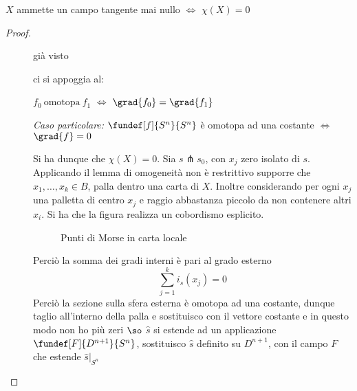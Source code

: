 

\begin{teo}
$X$ ammette un campo tangente mai nullo $\iff$ $\chi(X) = 0$
\end{teo}

\begin{proof}
~
	\begin{description}
		\item[\proofrightarrow]
		già visto		
		\item[\proofleftarrow]
		ci si appoggia al:
		\begin{teo}
		$f_0~\text{omotopa}~f_1$ $\iff$ $\grad{f_0} = \grad{f_1}$

		\emph{Caso particolare:} $\fundef[f]{S^n}{S^n}$ è omotopa ad una costante $\iff$ $\grad{f} = 0$
		\end{teo}
		Si ha dunque che $\chi(X) = 0$. Sia $s \pitchfork s_0$, con $x_j$ zero isolato di $s$.
		Applicando il lemma di omogeneità non è restrittivo supporre che $x_1, \dots, x_k \in B$, palla dentro una carta di $X$.
		Inoltre considerando per ogni $x_j$ una palletta di centro $x_j$ e raggio abbastanza piccolo da non contenere altri $x_i$.
		Si ha che la figura realizza un cobordismo esplicito.

		\begin{figure}[h]
		\centering
		
		\caption{Punti di Morse in carta locale}
		\end{figure}

		Perciò la somma dei gradi interni è pari al grado esterno
		\begin{equation}
		\sum_{j=1}^k i_s(x_j) = 0
		\end{equation}
		Perciò la sezione sulla sfera esterna è omotopa ad una costante, dunque taglio all'interno della palla e sostituisco con il 			vettore costante e in questo modo non  ho più zeri $\so$ $\hat{s}$ si estende ad un applicazione $\fundef[F]{D^{n+1}}{S^n}$, 			sostituisco $\hat{s}$ definito su $D^{n+1}$, con il campo $F$ che estende $\hat{s}|_{S^n}$
	\end{description}
\end{proof}

